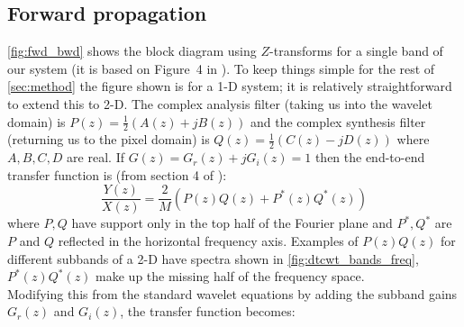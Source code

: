 \documentclass[9pt]{article}
\begin{document}
\subsection{Forward propagation}\autoref{fig:fwd_bwd} shows the block diagram using $Z$-transforms for a single band of our system (it
is based on Figure~4 in \cite{kingsbury_complex_2001}). To keep things simple for the rest of
\autoref{sec:method} the figure shown is for a 1-D system; 
it is relatively straightforward to extend this to 2-D\cite{selesnick_dual-tree_2005}. The complex
analysis filter (taking us into the wavelet domain) is $P(z) = \frac{1}{2}\left(A(z)+jB(z)\right)$ 
and the complex synthesis filter (returning us to the pixel domain) is 
$Q(z) = \frac{1}{2}\left(C(z) - jD(z)\right)$ 
where $A,B,C,D$ are real.  If $G(z) = G_r(z) + jG_i(z) = 1$ then the end-to-end transfer function is (from section 4 of
\cite{kingsbury_complex_2001}):
\begin{equation}\label{eq:end_to_end1}
\frac{Y(z)}{X(z)} = \frac{2}{M}\left(P(z)Q(z) + P^*(z)Q^*(z)\right)
\end{equation}
where $P, Q$ have support only in the top half of the Fourier plane and $P^*, Q^*$ are $P$ and $Q$ 
reflected in the horizontal frequency axis. Examples of $P(z)Q(z)$ for different subbands of a 2-D
\DTCWT have spectra shown in \autoref{fig:dtcwt_bands_freq}, $P^*(z)Q^*(z)$ make up the missing half
of the frequency space.\\
Modifying this from the standard wavelet equations by adding the subband gains $G_r(z)$ and
$G_i(z)$, the transfer function becomes:
\end{document}
